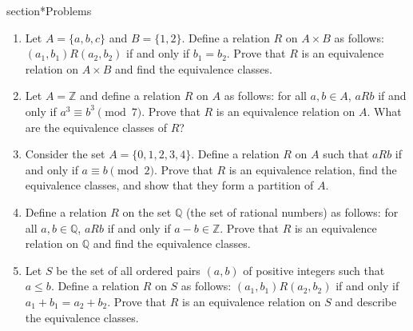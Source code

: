 section*{Problems}

\begin{enumerate}
\item
Let $A = \{a, b, c\}$ and $B = \{1, 2\}$. Define a relation $R$ on $A \times B$ as follows: $(a_1, b_1)R(a_2, b_2)$ if and only if $b_1 = b_2$. Prove that $R$ is an equivalence relation on $A \times B$ and find the equivalence classes.

\item
Let $A = \mathbb{Z}$ and define a relation $R$ on $A$ as follows: for all $a, b \in A$, $aRb$ if and only if $a^3 \equiv b^3 \pmod{7}$. Prove that $R$ is an equivalence relation on $A$. What are the equivalence classes of $R$?

\item
Consider the set $A = \{0, 1, 2, 3, 4\}$. Define a relation $R$ on $A$ such that $aRb$ if and only if $a \equiv b \pmod{2}$. Prove that $R$ is an equivalence relation, find the equivalence classes, and show that they form a partition of $A$.

\item
Define a relation $R$ on the set $\mathbb{Q}$ (the set of rational numbers) as follows: for all $a, b \in \mathbb{Q}$, $aRb$ if and only if $a - b \in \mathbb{Z}$. Prove that $R$ is an equivalence relation on $\mathbb{Q}$ and find the equivalence classes.

\item
Let $S$ be the set of all ordered pairs $(a, b)$ of positive integers such that $a \leq b$. Define a relation $R$ on $S$ as follows: $(a_1, b_1)R(a_2, b_2)$ if and only if $a_1 + b_1 = a_2 + b_2$. Prove that $R$ is an equivalence relation on $S$ and describe the equivalence classes.
\end{enumerate}
